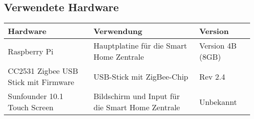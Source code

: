 \subsection{Verwendete Hardware}
\begin{tabularx}{\textwidth}{|p{5cm}|p{6cm}|p{3.2cm}|}
 	\hline
 	\textbf{Hardware} & \textbf{Verwendung} & \textbf{Version} \\
 	\hline
 	Raspberry Pi & Hauptplatine für die Smart Home Zentrale & Version 4B (8GB)\\
 	\hline
 	CC2531 Zigbee USB Stick mit Firmware & USB-Stick mit ZigBee-Chip & Rev 2.4\\
 	\hline
 	Sunfounder 10.1 Touch Screen  & Bildschirm und Input für die Smart Home Zentrale & Unbekannt\\
 	 \hline
\end{tabularx}
